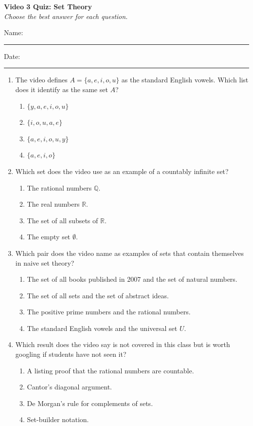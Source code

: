 \documentclass[10pt]{article}
\begin{document}
\begin{center}
  {\large\bfseries Video 3 Quiz: Set Theory}\\[0.25em]
  \textit{Choose the best answer for each question.}
\end{center}
\noindent Name:\ \rule{3.2in}{0.4pt}\hfill Date:\ \rule{1.25in}{0.4pt}
\vspace{0.7em}
\begin{enumerate}
  \item The video defines $A=\{a,e,i,o,u\}$ as the standard English vowels. Which list does it identify as the same set $A$?
  \begin{enumerate}
    \item $\{y,a,e,i,o,u\}$

    \item $\{i,o,u,a,e\}$
    
    \item $\{a,e,i,o,u,y\}$
    
    \item $\{a,e,i,o\}$
  \end{enumerate}

  \item Which set does the video use as an example of a countably infinite set?
  \begin{enumerate}
    \item The rational numbers $\mathbb{Q}$.
    \item The real numbers $\mathbb{R}$.
    \item The set of all subsets of $\mathbb{R}$.
    \item The empty set $\emptyset$.
  \end{enumerate}

  \item Which pair does the video name as examples of sets that contain themselves in naive set theory?
  \begin{enumerate}
    \item The set of all books published in 2007 and the set of natural numbers.
    \item The set of all sets and the set of abstract ideas.
    \item The positive prime numbers and the rational numbers.
    \item The standard English vowels and the universal set $U$.
  \end{enumerate}

  \item Which result does the video say is not covered in this class but is worth googling if students have not seen it?
  \begin{enumerate}
    \item A listing proof that the rational numbers are countable.
    \item Cantor's diagonal argument.
    \item De Morgan's rule for complements of sets.
    \item Set-builder notation.
  \end{enumerate}
\end{enumerate}
\end{document}
